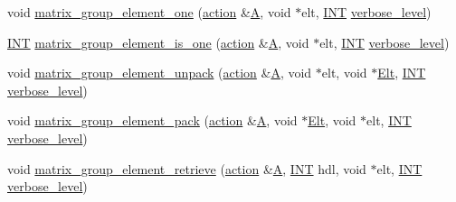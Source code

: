\begin{DoxyCompactItemize}
\item 
void \mbox{\hyperlink{interface__matrix__group_8_c_a3369a10e062775325436e0cdc58ad7f7}{matrix\+\_\+group\+\_\+element\+\_\+one}} (\mbox{\hyperlink{classaction}{action}} \&\mbox{\hyperlink{simeon_8_c_a97833f04c3a9c008df5521a2fc291bb4}{A}}, void $\ast$elt, \mbox{\hyperlink{galois_8h_a09fddde158a3a20bd2dcadb609de11dc}{I\+NT}} \mbox{\hyperlink{simeon_8_c_a818073fbcc2f439e7c56952f67386122}{verbose\+\_\+level}})
\item 
\mbox{\hyperlink{galois_8h_a09fddde158a3a20bd2dcadb609de11dc}{I\+NT}} \mbox{\hyperlink{interface__matrix__group_8_c_a41e2c457ec60d1c9ffb10a71362390a1}{matrix\+\_\+group\+\_\+element\+\_\+is\+\_\+one}} (\mbox{\hyperlink{classaction}{action}} \&\mbox{\hyperlink{simeon_8_c_a97833f04c3a9c008df5521a2fc291bb4}{A}}, void $\ast$elt, \mbox{\hyperlink{galois_8h_a09fddde158a3a20bd2dcadb609de11dc}{I\+NT}} \mbox{\hyperlink{simeon_8_c_a818073fbcc2f439e7c56952f67386122}{verbose\+\_\+level}})
\item 
void \mbox{\hyperlink{interface__matrix__group_8_c_a3821f8c9d4e26962410c97ad9772b3af}{matrix\+\_\+group\+\_\+element\+\_\+unpack}} (\mbox{\hyperlink{classaction}{action}} \&\mbox{\hyperlink{simeon_8_c_a97833f04c3a9c008df5521a2fc291bb4}{A}}, void $\ast$elt, void $\ast$\mbox{\hyperlink{simeon_8_c_aec1406935bdb1fee3561fcb840964100}{Elt}}, \mbox{\hyperlink{galois_8h_a09fddde158a3a20bd2dcadb609de11dc}{I\+NT}} \mbox{\hyperlink{simeon_8_c_a818073fbcc2f439e7c56952f67386122}{verbose\+\_\+level}})
\item 
void \mbox{\hyperlink{interface__matrix__group_8_c_a3432aa42c876df32887d4c7451287a5e}{matrix\+\_\+group\+\_\+element\+\_\+pack}} (\mbox{\hyperlink{classaction}{action}} \&\mbox{\hyperlink{simeon_8_c_a97833f04c3a9c008df5521a2fc291bb4}{A}}, void $\ast$\mbox{\hyperlink{simeon_8_c_aec1406935bdb1fee3561fcb840964100}{Elt}}, void $\ast$elt, \mbox{\hyperlink{galois_8h_a09fddde158a3a20bd2dcadb609de11dc}{I\+NT}} \mbox{\hyperlink{simeon_8_c_a818073fbcc2f439e7c56952f67386122}{verbose\+\_\+level}})
\item 
void \mbox{\hyperlink{interface__matrix__group_8_c_aefc74c0503168b62ff732d3cc131fdc6}{matrix\+\_\+group\+\_\+element\+\_\+retrieve}} (\mbox{\hyperlink{classaction}{action}} \&\mbox{\hyperlink{simeon_8_c_a97833f04c3a9c008df5521a2fc291bb4}{A}}, \mbox{\hyperlink{galois_8h_a09fddde158a3a20bd2dcadb609de11dc}{I\+NT}} hdl, void $\ast$elt, \mbox{\hyperlink{galois_8h_a09fddde158a3a20bd2dcadb609de11dc}{I\+NT}} \mbox{\hyperlink{simeon_8_c_a818073fbcc2f439e7c56952f67386122}{verbose\+\_\+level}})
\item 

\end{DoxyCompactItemize}
